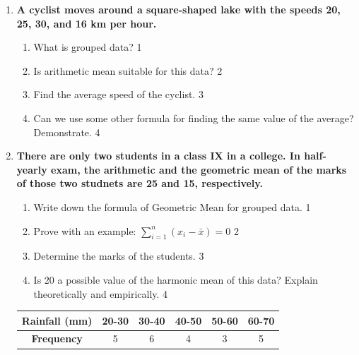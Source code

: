 \documentclass[a4paper,oneside]{book}
\begin{document}
\begin{enumerate}
  \begin{enumerate}
    \item
	When is harmonic mean suitable? \hfill 1
    \item
	Which mean could we use for the given data and why? \hfill 2
    \item  
	Find the average speed of the passer-by usingt he proper method. \hfill 3
    \item
	Find the correct and suitable average speed using another method and mathematically show they are equivalent. \hfill 4
  \end{enumerate}

 \item
	  \textbf{A cyclist moves around a square-shaped lake with the speeds 20, 25, 30, and 16 km per hour.} 
  
  \begin{enumerate}
    \item
	What is grouped data? \hfill 1
    \item
	Is arithmetic mean suitable for this data? \hfill 2
    \item  
	Find the average speed of the cyclist. \hfill 3
    \item
	Can we use some other formula for finding the same value of the average? Demonstrate. \hfill 4
  \end{enumerate}
  
     \item
	  \textbf{There are only two students in a class IX in a college. In half-yearly exam, the arithmetic and the geometric mean of the marks of those two studnets are 25 and 15, respectively.} 
  
  \begin{enumerate}
    \item
	Write down the formula of Geometric Mean for grouped data. \hfill 1
	\item Prove with an example: $\displaystyle \sum_{i=1}^n (x_i-\bar x) = 0$ \hfill 2
    \item  
	Determine the marks of the students. \hfill 3
    \item
	Is 20 a possible value of the harmonic mean of this data? Explain theoretically and empirically. \hfill 4
  \end{enumerate}

\begin{table}[h]
\centering
\begin{tabular}{c|c|c|c|c|c}
\textbf{Rainfall (mm)} & 20-30 & 30-40 & 40-50 & 50-60 & 60-70 \\ \hline
\textbf{Frequency} & 5 & 6 & 4 & 3 & 5
\end{tabular}
\end{table}


\end{enumerate}
\end{document}
